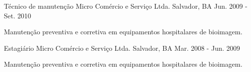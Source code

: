 \begin{cventries}
  \cventry
    {Técnico de manutenção} %
    {Micro Comércio e Serviço Ltda.} %
    {Salvador, BA} %
    {Jun. 2009 - Set. 2010} %
    {
      \begin{cvitems} %
        \item {Manutenção preventiva e corretiva em equipamentos hospitalares de bioimagem.}
      \end{cvitems}
    }

  \cventry
    {Estagiário} %
    {Micro Comércio e Serviço Ltda.} %
    {Salvador, BA} %
    {Mar. 2008 - Jun. 2009} %
    {
      \begin{cvitems} %
        \item {Manutenção preventiva e corretiva em equipamentos hospitalares de bioimagem.}
      \end{cvitems}
    }


\end{cventries}
